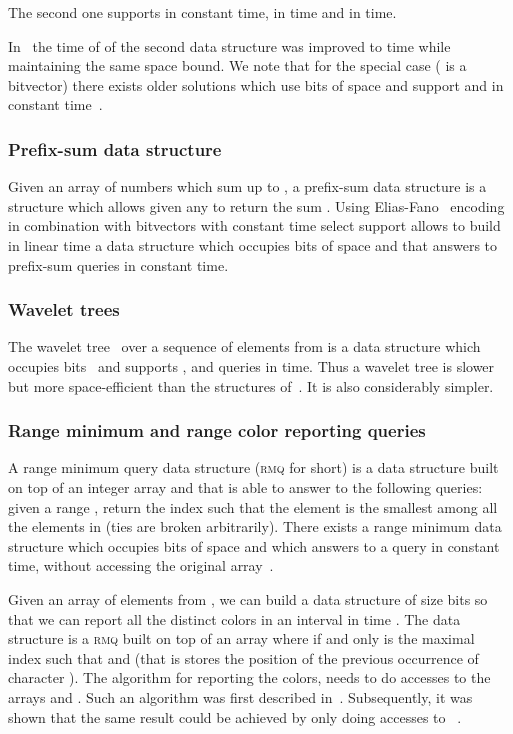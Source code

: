 \documentclass[a4paper]{article}
\begin{document}
The second one supports  in constant time,  in  time 
and  in  time. 

In~\cite{GOR10} the time of  of the second data structure was improved to
 time while maintaining the same space bound. 
We note that for the special case  ( is a bitvector) there exists older solutions which use  bits of space 
and support  and  in constant time~\cite{Cl96,Mun96}. 

\subsubsection{Prefix-sum data structure}
Given an array  of numbers which sum up to , a prefix-sum 
data structure is a structure which allows given any  
to return the sum . 
Using Elias-Fano~\cite{El74,Fa71} encoding in combination with bitvectors with constant time select support allows
to build in linear time a data structure which occupies  bits of space and that 
answers to prefix-sum queries in constant time. 


\subsubsection{Wavelet trees}
The wavelet tree~\cite{GGV03} over a sequence of  elements from  
is a data structure which occupies  bits~\cite{GGGRS07} and supports 
,  and  queries in  time. 
Thus a wavelet tree is slower but more space-efficient 
than the structures of~\cite{GMR06}. It is also considerably simpler. 


\subsubsection{Range minimum and range color reporting queries}

A range minimum query data structure (\textsc{rmq} for short)
is a data structure built on top of an integer 
array  and that is able to answer to the following queries: given 
a range , return the index  such that the element 
 is the smallest among all the elements in  (ties are broken 
arbitrarily). There exists a range minimum data structure which occupies 
bits of space and which answers to a query in constant time, without 
accessing the original array~\cite{Fi10}. 


Given an array  of  elements from , we can build a data structure of size  bits 
so that we can report all the  distinct colors in an interval  in time . 
The data structure is a \textsc{rmq} built on top of an array  where  
if and only  is the maximal index such that  and  (that 
is  stores the position of the previous occurrence of character ). 
The algorithm for reporting the colors, needs 
to do  accesses to the arrays  and . 
Such an algorithm was first described in~\cite{Mu02}. 
Subsequently, it was shown that the same result could be 
achieved by only doing  accesses to ~\cite{Sa07b}. 
\end{document}
